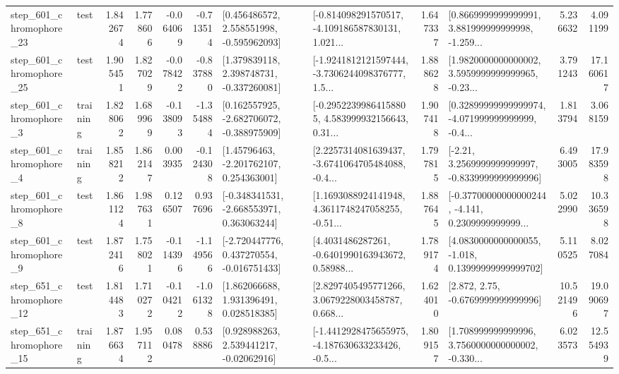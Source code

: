 \begin{tabular}{llrrrrllrlrr}
  step\_601\_chromophore\_23 &      test &      1.842674 &    1.778606 &     -0.064069 & -0.713514 &    [0.456486572, 2.558551998, -0.595962093] &  [-0.814098291570517, -4.109186587830131, 1.021... &       1.647337 &  [0.8669999999999991, 3.881999999999998, -1.259... &            5.236632 &          4.091199 \\
  step\_601\_chromophore\_25 &      test &      1.905451 &    1.827029 &     -0.078422 & -0.837880 &    [1.379839118, 2.398748731, -0.337260081] &  [-1.9241812121597444, -3.7306244098376777, 1.5... &       1.888628 &  [1.9820000000000002, 3.5959999999999965, -0.23... &            3.791243 &         17.160617 \\
   step\_601\_chromophore\_3 &  training &      1.828062 &    1.689969 &     -0.138093 & -1.354884 &   [0.162557925, -2.682706072, -0.388975909] &  [-0.29522399864158805, 4.583999932156643, 0.31... &       1.907418 &  [0.32899999999999974, -4.071999999999999, -0.4... &            1.813794 &          3.068159 \\
   step\_601\_chromophore\_4 &  training &      1.858212 &    1.862147 &      0.003935 & -0.124308 &     [1.45796463, -2.201762107, 0.254363001] &  [2.2257314081639437, -3.6741064705484088, -0.4... &       1.797815 &   [-2.21, 3.2569999999999997, -0.8339999999999996] &            6.493005 &         17.983598 \\
   step\_601\_chromophore\_8 &      test &      1.861124 &    1.987631 &      0.126507 &  0.937696 &   [-0.348341531, -2.668553971, 0.363063244] &  [1.1693088924141948, 4.3611748247058255, -0.51... &       1.887645 &  [-0.37700000000000244, -4.141, 0.2309999999999... &            5.022990 &         10.336598 \\
   step\_601\_chromophore\_9 &      test &      1.872416 &    1.758021 &     -0.114396 & -1.149566 &   [-2.720447776, 0.437270554, -0.016751433] &  [4.4031486287261, -0.6401990163943672, 0.58988... &       1.789174 &  [4.0830000000000055, -1.018, 0.13999999999999702] &            5.110525 &          8.027084 \\
  step\_651\_chromophore\_12 &      test &      1.814483 &    1.710272 &     -0.104212 & -1.061328 &     [1.862066688, 1.931396491, 0.028518385] &  [2.8297405495771266, 3.0679228003458787, 0.668... &       1.624010 &                 [2.872, 2.75, -0.6769999999999996] &           10.521496 &         19.090697 \\
  step\_651\_chromophore\_15 &  training &      1.876634 &    1.957112 &      0.080478 &  0.538886 &     [0.928988263, 2.539441217, -0.02062916] &  [-1.4412928475655975, -4.187630633233426, -0.5... &       1.809157 &  [1.708999999999996, 3.7560000000000002, -0.330... &            6.023573 &         12.554939 \\

\end{tabular}
